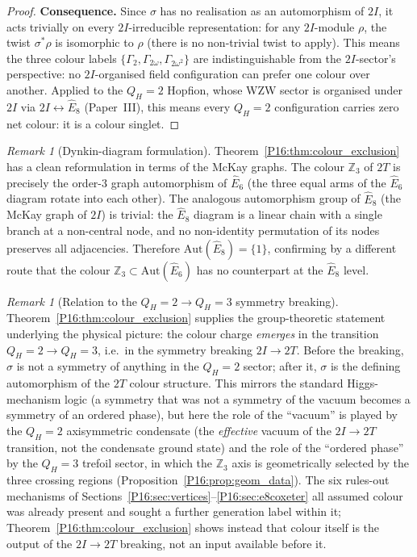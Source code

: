 \documentclass[11pt,a4paper]{article}
\theoremstyle{definition}\newtheorem{definition}[theorem]{Definition}
\theoremstyle{remark}
\newtheorem{remark}[theorem]{Remark}
\theoremstyle{definition}\newtheorem{construction}[theorem]{Construction}
\newcommand{\twoI}{2I}
\newcommand{\twoT}{2T}
\newcommand{\QH}{Q_H}
\begin{document}
\begin{proof}
\textbf{Consequence.} Since $\sigma$ has no realisation as an
automorphism of $\twoI$, it acts trivially on every $\twoI$-irreducible
representation: for any $\twoI$-module $\rho$, the twist $\sigma^*\rho$
is isomorphic to $\rho$ (there is no non-trivial twist to apply). This
means the three colour labels $\{{\Gamma_2},\Gamma_{2\omega},
\Gamma_{2\omega^2}\}$ are indistinguishable from the $\twoI$-sector's
perspective: no $\twoI$-organised field configuration can prefer one
colour over another. Applied to the $\QH=2$ Hopfion, whose WZW sector
is organised under $\twoI$ via $\twoI\leftrightarrow\widehat{E}_8$
(Paper~III), this means every $\QH=2$ configuration carries zero net
colour: it is a colour singlet.
\end{proof}

\begin{remark}[Dynkin-diagram formulation]
\label{P16:rem:dynkin_colour}
Theorem~\ref{P16:thm:colour_exclusion} has a clean reformulation in terms
of the McKay graphs. The colour $\mathbb{Z}_3$ of $\twoT$ is precisely
the order-$3$ graph automorphism of $\widehat{E}_6$ (the three equal
arms of the $\widehat{E}_6$ diagram rotate into each other). The
analogous automorphism group of $\widehat{E}_8$ (the McKay graph of
$\twoI$) is trivial: the $\widehat{E}_8$ diagram is a linear chain
with a single branch at a non-central node, and no non-identity
permutation of its nodes preserves all adjacencies. Therefore
$\mathrm{Aut}(\widehat{E}_8)=\{1\}$, confirming by a different route
that the colour $\mathbb{Z}_3\subset\mathrm{Aut}(\widehat{E}_6)$ has
no counterpart at the $\widehat{E}_8$ level.
\end{remark}

\begin{remark}[Relation to the $\QH=2\to\QH=3$ symmetry breaking]
\label{P16:rem:symmetry_breaking_colour}
Theorem~\ref{P16:thm:colour_exclusion} supplies the group-theoretic
statement underlying the physical picture: the colour charge
\emph{emerges} in the transition $\QH=2\to\QH=3$, i.e.\ in the
symmetry breaking $\twoI\to\twoT$. Before the breaking, $\sigma$ is
not a symmetry of anything in the $\QH=2$ sector; after it,
$\sigma$ is the defining automorphism of the $\twoT$ colour structure.
This mirrors the standard Higgs-mechanism logic (a symmetry that was
not a symmetry of the vacuum becomes a symmetry of an ordered phase),
but here the role of the ``vacuum'' is played by the $\QH=2$
axisymmetric condensate (the \emph{effective} vacuum of the
$\twoI\to\twoT$ transition, not the condensate ground state) and the role
of the ``ordered phase'' by the
$\QH=3$ trefoil sector, in which the $\mathbb{Z}_3$ axis is
geometrically selected by the three crossing regions
(Proposition~\ref{P16:prop:geom_data}).
The six rules-out mechanisms of
Sections~\ref{P16:sec:vertices}--\ref{P16:sec:e8coxeter} all assumed colour
was already present and sought a further generation label within it;
Theorem~\ref{P16:thm:colour_exclusion} shows instead that colour itself is
the output of the $\twoI\to\twoT$ breaking, not an input available
before it.
\end{remark}
\end{document}
